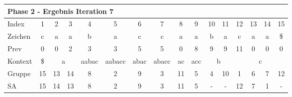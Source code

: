 \begin{table}[H]
\centering
\begin{adjustbox}{max width=\textwidth}
\centering
\begin{tabular}{lccccccccccccccc}
\multicolumn{16}{l}{Phase 2 - Ergebnis Iteration 7}                                                                                                                                                                                                                                                                                       \\ \hline
\multicolumn{1}{l|}{Index}   & 1                       & 2  & 3                       & 4                          & 5                           & 6                         & 7                                              & 8                       & 9                        & 10 & 11                      & 12  & 13  & 14  & 15  \\
\multicolumn{1}{l|}{Zeichen} & c                       & a  & a                       & b                          & a                           & c                         & c                                              & a                       & a                        & b  & a                       & c   & a   & a   & \$  \\
\multicolumn{1}{l|}{Prev}    & 0                       & 0  & 2                       & 3                          & 3                           & 5                         & 5                                              & 0                       & 8                        & 9  & 9                       & 11  & 0   & 0   & 0   \\ \hline
\multicolumn{1}{l|}{Kontext} & \multicolumn{1}{c|}{\$} & \multicolumn{2}{c|}{a}       & \multicolumn{1}{c|}{aabac} & \multicolumn{1}{c|}{aabacc} & \multicolumn{1}{c|}{abac} & \multicolumn{1}{c|}{abacc}                     & \multicolumn{1}{c|}{ac} & \multicolumn{1}{c|}{acc} & \multicolumn{2}{c|}{b}       & \multicolumn{4}{c}{c} \\
\multicolumn{1}{l|}{Gruppe}  & \multicolumn{1}{c|}{15} & 13 & \multicolumn{1}{c|}{14} & \multicolumn{1}{c|}{8}     & \multicolumn{1}{c|}{2}      & \multicolumn{1}{c|}{9}    & \multicolumn{1}{c|}{3}                         & \multicolumn{1}{c|}{11} & \multicolumn{1}{c|}{5}   & 4  & \multicolumn{1}{c|}{10} & 1   & 6   & 7   & 12  \\
\multicolumn{1}{l|}{SA}      & \multicolumn{1}{c|}{15} & 14 & \multicolumn{1}{c|}{13} & \multicolumn{1}{c|}{8}     & \multicolumn{1}{c|}{2}      & \multicolumn{1}{c|}{9}    & \multicolumn{1}{c|}{\cellcolor[HTML]{\green}3} & \multicolumn{1}{c|}{11} & \multicolumn{1}{c|}{5}   & -  & \multicolumn{1}{c|}{-}  & 12  & 7   & 1   & -  
\end{tabular}
\end{adjustbox}


\end{table}
